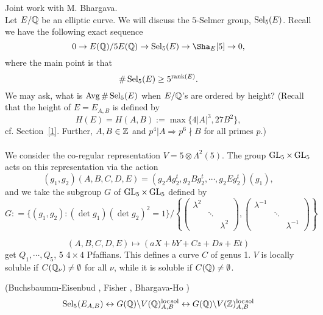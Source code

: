 \documentclass[12pt,amsfont]{amsart}
\begin{document}
Joint work with M. Bhargava. \\
Let $E/{\mathbb Q}$ be an elliptic curve. We will discuss the $5$-Selmer group, $\operatorname{Sel}_5(E)$. Recall we have the following exact sequence
\[0 \rightarrow E(\bQ)/5 E(\bQ) \rightarrow \Sel_5(E) \rightarrow \Sha_E[5] \rightarrow 0, \]
where the main point is that 
\[
\# \operatorname{Sel}_5(E) \geq 5^{\operatorname{rank}(E)}.
\]
We may ask, what is $\operatorname{Avg} \# \operatorname{Sel}_5(E)$ when $E/{\mathbb Q}$'s are ordered by height? (Recall that the height of $E = E_{A,B}$ is defined by 
\[
H(E)= H(A,B):= \max\{4|A|^3, 27B^2\},
\] cf. Section~\ref{1}. Further, $A,B \in {\mathbb Z}$ and $p^4 | A \Rightarrow p^6 \nmid B$ for all primes $p$.)\\ \\
We consider the co-regular representation $V = 5 \otimes \Lambda^2(5)$. The group $\operatorname{GL}_5 \times \operatorname{GL}_5$ acts on this representation via the action
\[(g_1, g_2)(A,B,C,D,E) = (g_2 A g_2^t, g_2Bg_2^t, \cdots, g_2 E g_2^t)(g_1),\]
and we take the subgroup $G$ of $\operatorname{GL}_5 \times \operatorname{GL}_5$ defined by
\[G: = \{(g_1, g_2) : (\det g_1)(\det g_2)^2 = 1\}/\left\{\begin{pmatrix} \lambda^2 & & \\ & \ddots & \\ & & \lambda^2 \end{pmatrix}, \begin{pmatrix} \lambda^{-1} & & \\ & \ddots & \\ & & \lambda^{-1} \end{pmatrix} \right \}\]

\begin{rmk} \[(A,B,C,D,E) \mapsto (aX + bY + Cz + Ds + Et) \]
get $Q_1, \cdots, Q_5$, 5 $4 \times 4$ Pfaffians. This defines a curve $C$ of genus 1. $V$ is locally soluble if $C({\mathbb Q}_\nu) \ne \emptyset$ for all $\nu$, while it is soluble if $C({\mathbb Q}) \ne \emptyset$. 
\end{rmk}

\begin{thm} (Buchsbaumm-Eisenbud , Fisher , Bhargava-Ho )
\[\operatorname{Sel}_5(E_{A,B}) \leftrightarrow G({\mathbb Q}) \backslash V({\mathbb Q})_{A,B}^{\text{loc\,sol}} \leftrightarrow G({\mathbb Q}) \backslash V({\mathbb Z})_{A,B}^{\text{loc\,sol}} \]
\end{thm} 
\end{document}
